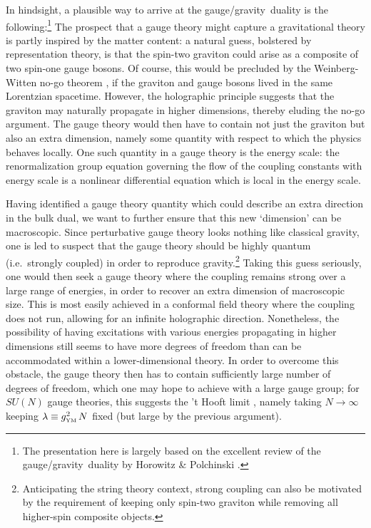 \documentclass[12pt,a4paper]{article}
\def\GG{gauge/gravity}
\def\gYM{g_{\scriptscriptstyle {\rm YM}}}
\begin{document}
In hindsight, a plausible way to arrive at the \GG\ duality is the following:\footnote{
The presentation here is  largely based on the excellent review of the \GG\ duality by Horowitz \& Polchinski \cite{Horowitz:2006ct}.}
The prospect that a gauge theory might capture a gravitational theory is partly inspired by the matter content: a natural guess, bolstered by representation theory, is that the spin-two graviton could arise as a composite of two spin-one gauge bosons.  Of course, this would be precluded by the Weinberg-Witten no-go theorem \cite{Weinberg:1980kq}, if the graviton and gauge bosons lived in the same Lorentzian spacetime.  However, the holographic principle suggests that the graviton may naturally propagate in higher dimensions, thereby eluding the no-go argument.  The gauge theory would then have to contain not just the graviton but also an extra dimension, namely some quantity with respect to which the physics behaves locally.  One such quantity in a gauge theory is the energy scale:  the renormalization group equation governing the flow of the coupling constants with energy scale is a nonlinear differential equation which is local in the energy scale.  

Having identified a gauge theory quantity which could describe an extra direction in the bulk dual, we want to further ensure that this new `dimension' can be macroscopic.  Since perturbative gauge theory looks nothing like classical gravity, one is led to suspect that the gauge theory should be highly quantum (i.e.\ strongly coupled) in order to reproduce gravity.\footnote{
Anticipating the string theory context, strong coupling can also be motivated by the requirement of keeping only spin-two graviton while removing all higher-spin composite objects.
}
Taking this guess seriously, one would then seek a gauge theory where the coupling remains strong over a large range of energies, in order to recover an extra dimension of macroscopic size.  This is most easily achieved in a conformal field theory where the coupling does not run, allowing for an infinite holographic direction.  
Nonetheless, the possibility of having excitations with various energies propagating in higher dimensions still seems to have more degrees of freedom than can be accommodated within a lower-dimensional theory.  In order to overcome this obstacle, the gauge theory then has to contain sufficiently large number of degrees of freedom, which one may hope to  achieve with a large gauge group;  for $SU(N)$ gauge theories, this suggests the  't Hooft limit \cite{tHooft:1973jz}, namely taking $N \to \infty$ keeping $\lambda \equiv \gYM^2 \, N$ fixed (but large by the previous argument).
\end{document}
